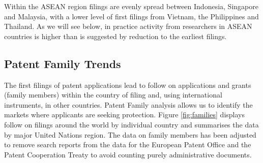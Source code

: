 \documentclass[]{book}
\theoremstyle{definition}
\theoremstyle{definition}
\theoremstyle{definition}
\theoremstyle{remark}
\begin{document}
Within the ASEAN region filings are evenly spread between Indonesia,
Singapore and Malaysia, with a lower level of first filings from
Vietnam, the Philippines and Thailand. As we will see below, in practice
activity from researchers in ASEAN countries is higher than is suggested
by reduction to the earliest filings.

\hypertarget{patent-family-trends}{%
\subsection{Patent Family Trends}\label{patent-family-trends}}

The first filings of patent applications lead to follow on applications
and grants (family members) within the country of filing and, using
international instruments, in other countries. Patent Family analysis
allows us to identify the markets where applicants are seeking
protection. Figure \ref{fig:families} displays follow on filings around
the world by individual country and summarises the data by major United
Nations region. The data on family members has been adjusted to remove
search reports from the data for the European Patent Office and the
Patent Cooperation Treaty to avoid counting purely administrative
documents.
\end{document}
